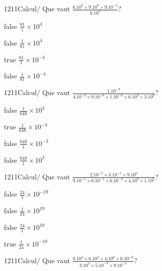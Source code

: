             \begin{question}{1211}{Calcul}{}{/}
                Que vaut $\frac{6.10^{0}\times 9.10^{0}\times 9.10^{-2}}{6.10^{2}}$?
            \end{question}
            \begin{reponses}
                \item[false] $\frac{81}{1}\times 10^{4}$
                \item[false] $\frac{1}{81}\times 10^{4}$
                \item[true] $\frac{81}{1}\times 10^{-4}$
                \item[false] $\frac{1}{81}\times 10^{-4}$
            \end{reponses}
            \begin{question}{1211}{Calcul}{}{/}
                Que vaut $\frac{1.10^{-8}}{4.10^{-3}\times 9.10^{-8}\times 1.10^{-6}\times 6.10^{3}\times 3.10^{9}}$?
            \end{question}
            \begin{reponses}
                \item[false] $\frac{1}{648}\times 10^{3}$
                \item[true] $\frac{1}{648}\times 10^{-3}$
                \item[false] $\frac{648}{1}\times 10^{-3}$
                \item[false] $\frac{648}{1}\times 10^{3}$
            \end{reponses}
            \begin{question}{1211}{Calcul}{}{/}
                Que vaut $\frac{2.10^{-7}\times 3.10^{-5}\times 9.10^{0}}{9.10^{-1}\times 6.10^{-1}\times 6.10^{-3}\times 4.10^{9}\times 1.10^{3}}$?
            \end{question}
            \begin{reponses}
                \item[false] $\frac{24}{1}\times 10^{-19}$
                \item[false] $\frac{1}{24}\times 10^{19}$
                \item[false] $\frac{24}{1}\times 10^{19}$
                \item[true] $\frac{1}{24}\times 10^{-19}$
            \end{reponses}
            \begin{question}{1211}{Calcul}{}{/}
                Que vaut $\frac{8.10^{4}\times 6.10^{2}\times 4.10^{6}\times 6.10^{-6}}{3.10^{3}\times 5.10^{-8}\times 9.10^{-8}}$?
            \end{question}

